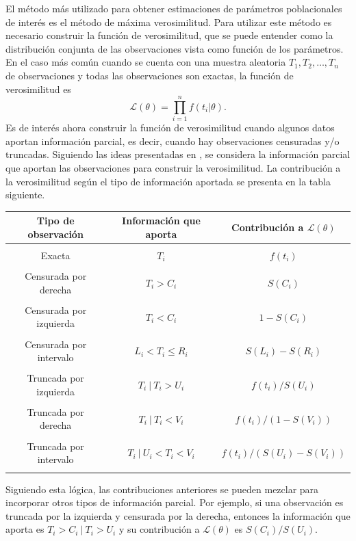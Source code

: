 \documentclass[11pt,a4paper]{article}
\begin{document}
El método más utilizado para obtener estimaciones de parámetros poblacionales de interés es el método de máxima verosimilitud. Para utilizar este método es necesario construir la función de verosimilitud, que se puede entender como la distribución conjunta de las observaciones vista como función de los parámetros. En el caso más común cuando se cuenta con una muestra aleatoria $T_1, T_2, \dots, T_n$ de observaciones y todas las observaciones son exactas, la función de verosimilitud es $$\mathcal{L}(\theta) = \prod_{i = 1}^n f(t_i|\theta).$$ Es de interés ahora construir la función de verosimilitud cuando algunos datos aportan información parcial, es decir, cuando hay observaciones censuradas y/o truncadas. Siguiendo las ideas presentadas en \citet{klein}, se considera la información parcial que aportan las observaciones para construir la verosimilitud. La contribución a la verosimilitud según el tipo de información aportada se presenta en la tabla siguiente.\\

\begin{center}
\begin{tabular}{ |c|c|c| } 
 \hline
 Tipo de observación & Información que aporta & Contribución a $\mathcal{L}(\theta)$\\
 \hline
 & & \\
 Exacta & $T_i$ & $f(t_i)$\\
  & & \\
 Censurada por derecha & $T_i > C_i$ & $S(C_i)$\\
  & & \\
 Censurada por izquierda & $T_i < C_i$ & $1-S(C_i)$\\
  & & \\
 Censurada por intervalo & $L_i < T_i \leq R_i$ & $S(L_i)-S(R_i)$\\
  & & \\
 Truncada por izquierda & $T_i \ | \ T_i > U_i$ & $f(t_i)/S(U_i)$ \\
  & & \\
 Truncada por derecha & $T_i \ | \ T_i < V_i$ & $f(t_i)/(1-S(V_i))$ \\
  & & \\
 Truncada por intervalo & $T_i \ | \ U_i < T_i < V_i$ & $f(t_i)/(S(U_i)-S(V_i))$ \\
  & & \\
 \hline
\end{tabular}
\end{center}

Siguiendo esta lógica, las contribuciones anteriores se pueden mezclar para incorporar otros tipos de información parcial. Por ejemplo, si una observación es truncada por la izquierda y censurada por la derecha, entonces la información que aporta es $T_i>C_i \ | \ T_i > U_i$ y su contribución a $\mathcal{L}(\theta)$ es $S(C_i)/S(U_i)$.\\
\end{document}
